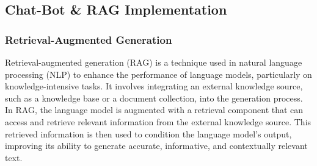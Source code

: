 \documentclass{article}
\begin{document}
	\begin{center}
	\end{center}
	
	\subsection{Chat-Bot \& RAG Implementation}
	
	\subsubsection{Retrieval-Augmented Generation}
	Retrieval-augmented generation (RAG) is a technique used in natural language processing (NLP) to enhance the performance of language models, particularly on knowledge-intensive tasks. It involves integrating an external knowledge source, such as a knowledge base or a document collection, into the generation process. 
	In RAG, the language model is augmented with a retrieval component that can access and retrieve relevant information from the external knowledge source. This retrieved information is then used to condition the language model's output, improving its ability to generate accurate, informative, and contextually relevant text. 
	
\end{document}
